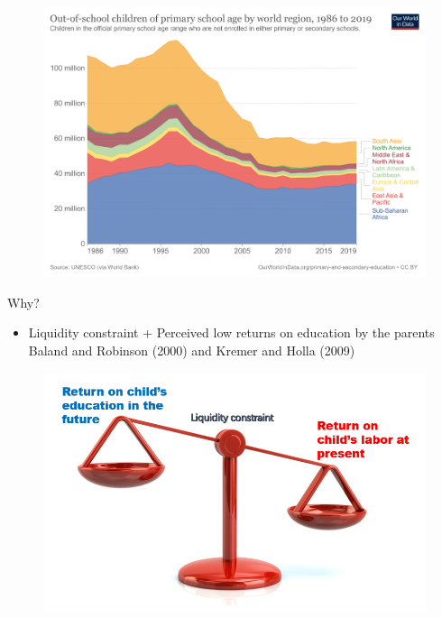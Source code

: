 \documentclass{beamer}
\begin{document}
\begin{frame}
    \begin{figure}
        \centering
        \includegraphics[scale=0.08]{images/out-of-school.png}
        \label{fig:out-of-school}
    \end{figure}
\end{frame}


\begin{frame}{Why?}
    \begin{itemize}
        \item Liquidity constraint + Perceived low returns on education by the parents \textcolor{mygray}{Baland and Robinson (2000) and Kremer and Holla (2009)}
    \end{itemize}
    \begin{figure}
        \centering
        \includegraphics[scale=0.5]{images/balance1.png}
        \label{fig:balance1}
    \end{figure}
\end{frame}
\end{document}
